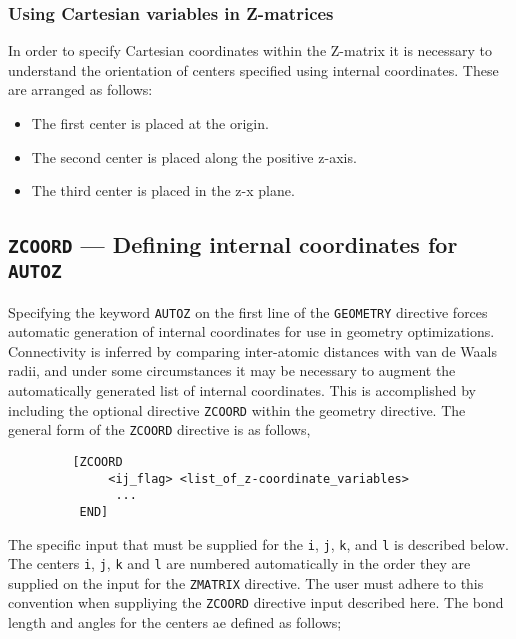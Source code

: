 \subsubsection{Using Cartesian variables in Z-matrices}
\label{sec:zmcart}

In order to specify Cartesian coordinates within the Z-matrix it is
necessary to understand the orientation of centers specified using
internal coordinates.  These are arranged as follows:
\begin{itemize}
\item The first center is placed at the origin.
\item The second center is placed along the positive z-axis.
\item The third center is placed in the z-x plane.
\end{itemize}

\subsection{{\tt ZCOORD} --- Defining internal coordinates for {\tt AUTOZ}}
\label{sec:zcoord}

Specifying the keyword \verb+AUTOZ+ on the first line of the \verb+GEOMETRY+
directive forces automatic generation of internal
coordinates for use in geometry optimizations.  Connectivity
is inferred by comparing inter-atomic distances with van de Waals
radii, and under some circumstances it may be necessary to augment the
automatically generated list of internal coordinates.  This is
accomplished by including the optional directive {\tt ZCOORD} within the geometry
directive.  The general form of the \verb+ZCOORD+ directive is as follows,
\begin{verbatim}
         [ZCOORD
              <ij_flag> <list_of_z-coordinate_variables>
               ...
          END]
\end{verbatim}

The specific input that must be supplied for the \verb+i+, \verb+j+, \verb+k+, and
\verb+l+ is described below.  The centers 
\verb+i+, \verb+j+, \verb+k+ and \verb+l+ are numbered automatically in the
order they are supplied on the input for the \verb+ZMATRIX+ directive.  The
user must adhere to this convention when suppliying the \verb+ZCOORD+
directive input described here.  The bond length and angles for the centers
ae defined as follows;

